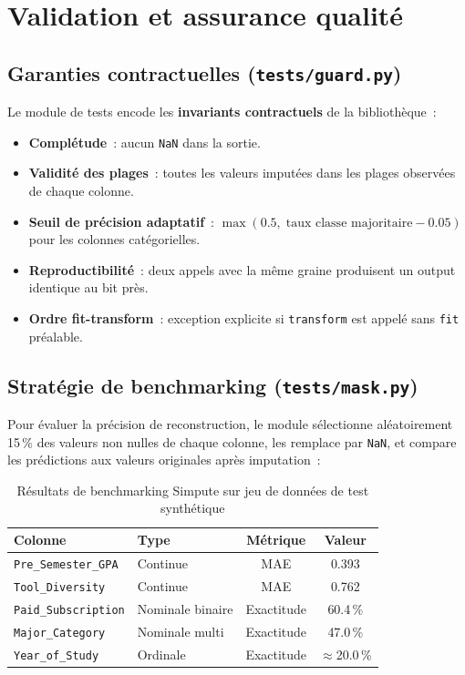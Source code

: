 \documentclass[12pt,a4paper]{report}
\begin{document}
\section{Validation et assurance qualité}

\subsection{Garanties contractuelles (\texttt{tests/guard.py})}

Le module de tests encode les \textbf{invariants contractuels} de la bibliothèque~:
\begin{itemize}
  \item \textbf{Complétude}~: aucun \texttt{NaN} dans la sortie.
  \item \textbf{Validité des plages}~: toutes les valeurs imputées dans les plages observées de chaque colonne.
  \item \textbf{Seuil de précision adaptatif}~: $\max(0.5,\; \text{taux classe majoritaire} - 0.05)$ pour les colonnes catégorielles.
  \item \textbf{Reproductibilité}~: deux appels avec la même graine produisent un output identique au bit près.
  \item \textbf{Ordre fit-transform}~: exception explicite si \texttt{transform} est appelé sans \texttt{fit} préalable.
\end{itemize}

\subsection{Stratégie de benchmarking (\texttt{tests/mask.py})}

Pour évaluer la précision de reconstruction, le module sélectionne aléatoirement 15\,\% des valeurs non nulles de chaque colonne, les remplace par \texttt{NaN}, et compare les prédictions aux valeurs originales après imputation~:

\begin{table}[H]
\centering
\caption{Résultats de benchmarking Simpute sur jeu de données de test synthétique}
\label{tab:simpute_results}
\begin{tabular}{llcc}
\toprule
\textbf{Colonne} & \textbf{Type} & \textbf{Métrique} & \textbf{Valeur} \\
\midrule
\texttt{Pre\_Semester\_GPA} & Continue & MAE & 0.393 \\
\texttt{Tool\_Diversity} & Continue & MAE & 0.762 \\
\texttt{Paid\_Subscription} & Nominale binaire & Exactitude & 60.4\,\% \\
\texttt{Major\_Category} & Nominale multi & Exactitude & 47.0\,\% \\
\texttt{Year\_of\_Study} & Ordinale & Exactitude & $\approx$20.0\,\% \\
\bottomrule
\end{tabular}
\end{table}
\end{document}
